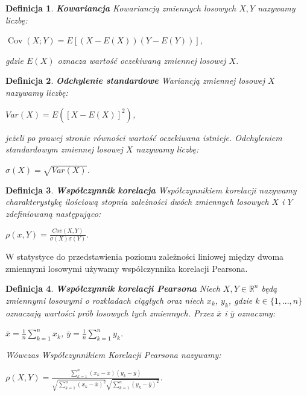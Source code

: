 \documentclass[12pt,a4paper]{report}
\newtheorem{df}{Definicja}[chapter]
\newcommand{\setR}{\mathbb{R}}
\newcommand{\Covariance}[2]{\operatorname{Cov}\left({#1}; {#2} \right)}
\begin{document}
\begin{df}\textbf{Kowariancja}
Kowariancją zmiennych losowych $X,Y$ nazywamy liczbę:
\begin{center}
$\Covariance{X}{Y} = E[(X-E(X))(Y-E(Y))]$,
\end{center}
gdzie $E(X)$ oznacza wartość oczekiwaną zmiennej losowej $X$.
\end{df}
\begin{df}\textbf{Odchylenie standardowe}
Wariancją zmiennej losowej $X$ nazywamy liczbę:
\begin{center}
$Var(X)=E([X-E(X)]^2)$,
\end{center}
jeżeli po prawej stronie równości wartość oczekiwana istnieje. 
Odchyleniem standardowym zmiennej losowej $X$ nazywamy liczbę:
\begin{center}
$\sigma(X)=\sqrt{Var(X)}$.
\end{center}
\end{df}
\begin{df}\textbf{Współczynnik korelacja}
Współczynnikiem korelacji nazywamy charakterystykę ilościową stopnia zależności dwóch zmiennych losowych $X$ i $Y$ zdefiniowaną następująco:
\begin{center}
$\rho(x,Y) = \frac{Cov(X,Y)}{\sigma(X)\sigma(Y)}$.
\end{center}
\end{df}
W statystyce do przedstawienia poziomu zależności liniowej między dwoma zmiennymi losowymi używamy współczynnika korelacji Pearsona.
\begin{df}\textbf{Współczynnik korelacji Pearsona}
Niech $X,Y \in \setR^n$ będą zmiennymi losowymi o rozkładach ciągłych oraz niech $x_k$, $y_k$, gdzie $k\in\{1,...,n\}$ oznaczają wartości prób losowych tych zmiennych. 
Przez $\overline{x}$ i $\overline{y}$ oznaczmy:
\begin{center}
$\overline{x}=\frac{1}{n} \sum_{k=1}^n x_k$,
$\overline{y}=\frac{1}{n} \sum_{k=1}^n y_k$.
\end{center}
Wówczas Współczynnikiem Korelacji Pearsona nazywamy:
\begin{center}
$\rho(X,Y) = \frac{\sum_{k=1}^n(x_k - \overline{x})(y_k - \overline{y})}{\sqrt{\sum_{k=1}^n(x_k - \overline{x})^2} \sqrt{\sum_{k=1}^n(y_k - \overline{y})^2 }}$.
\end{center}
\end{df}
\end{document}
